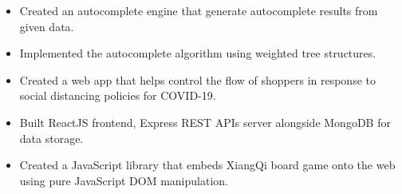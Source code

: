 \vspace{5pt}

\begin{itemize}
	\item Created an autocomplete engine that generate autocomplete results from given data.
	\item Implemented the autocomplete algorithm using weighted tree structures.
\end{itemize}

\divider


\vspace{5pt}

\begin{itemize}
	\item Created a web app that helps control the flow of shoppers in response to social distancing policies for COVID-19.
	\item Built ReactJS frontend, Express REST APIs server alongside MongoDB for data storage.
\end{itemize}

\divider


\vspace{5pt}

\begin{itemize}
	\item Created a JavaScript library that embeds XiangQi board game onto the web using pure JavaScript DOM manipulation.
\end{itemize}

